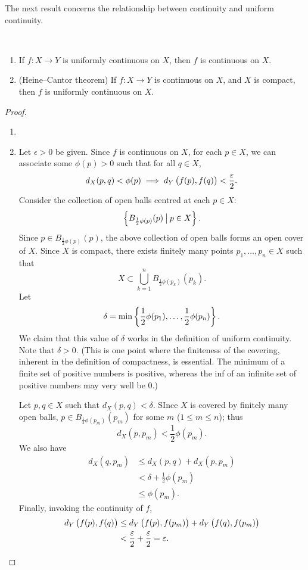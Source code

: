 The next result concerns the relationship between continuity and uniform continuity.

\begin{lemma}\label{lemma:continuity-uniform-continuity} \
\begin{enumerate}[label=(\roman*)]
\item If $f:X\to Y$ is uniformly continuous on $X$, then $f$ is continuous on $X$.
\item (Heine--Cantor theorem) If $f:X\to Y$ is continuous on $X$, and $X$ is compact, then $f$ is uniformly continuous on $X$.
\end{enumerate}
\end{lemma}

\begin{proof} \
\begin{enumerate}[label=(\roman*)]
\item 
\item Let $\epsilon>0$ be given. Since $f$ is continuous on $X$, for each $p\in X$, we can associate some $\phi(p)>0$ such that for all $q\in X$,
\[d_X(p,q)<\phi(p)\implies d_Y\left(f(p),f(q)\right)<\frac{\varepsilon}{2}.\]
Consider the collection of open balls centred at each $p\in X$:
\[\left\{B_{\frac{1}{2}\phi(p)}(p)\:\big|\:p\in X\right\}.\]
Since $p\in B_{\frac{1}{2}\phi(p)}(p)$, the above collection of open balls forms an open cover of $X$. Since $X$ is compact, there exists finitely many points $p_1,\dots,p_n\in X$ such that
\[X\subset\bigcup_{k=1}^{n}B_{\frac{1}{2}\phi(p_k)}(p_k).\]
Let
\[\delta=\min\left\{\frac{1}{2}\phi(p_1),\dots,\frac{1}{2}\phi(p_n)\right\}.\]
We claim that this value of $\delta$ works in the definition of uniform continuity. Note that $\delta>0$. (This is one point where the finiteness of the covering, inherent in the definition of compactness, is essential. The minimum of a finite set of positive numbers is positive, whereas the inf of an infinite set of positive numbers may very well be 0.) 

Let $p,q\in X$ such that $d_X(p,q)<\delta$. SInce $X$ is covered by finitely many open balls, $p\in B_{\frac{1}{2}\phi(p_m)}(p_m)$ for some $m$ ($1\le m\le n$); thus
\[d_X(p,p_m)<\frac{1}{2}\phi(p_m).\]
We also have
\begin{align*}
d_X(q,p_m)&\le d_X(p,q)+d_X(p,p_m)\\
&<\delta+\frac{1}{2}\phi(p_m)\\
&\le\phi(p_m).
\end{align*}
Finally, invoking the continuity of $f$,
\begin{align*}
d_Y\left(f(p),f(q)\right)&\le d_Y\left(f(p),f(p_m)\right)+d_Y\left(f(q),f(p_m)\right)\\
&<\frac{\varepsilon}{2}+\frac{\varepsilon}{2}=\varepsilon.
\end{align*}
\end{enumerate}
\end{proof}

